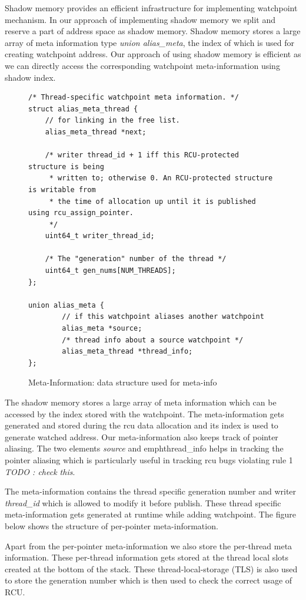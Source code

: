 Shadow memory provides an efficient infrastructure for implementing watchpoint mechanism. In our approach of implementing shadow memory we split and reserve a part of address space as shadow memory. Shadow memory stores a large array of meta information type \emph{union alias\_meta}, the index of which is used for creating watchpoint address. Our approach of using shadow memory is efficient as we can directly access the corresponding watchpoint meta-information using shadow index. 

\begin{figure}[h]
\begin{lstlisting}
/* Thread-specific watchpoint meta information. */
struct alias_meta_thread {
    // for linking in the free list.
    alias_meta_thread *next;

    /* writer thread_id + 1 iff this RCU-protected structure is being
     * written to; otherwise 0. An RCU-protected structure is writable from
     * the time of allocation up until it is published using rcu_assign_pointer.
     */
    uint64_t writer_thread_id;

    /* The "generation" number of the thread */
    uint64_t gen_nums[NUM_THREADS];
};

union alias_meta {
        // if this watchpoint aliases another watchpoint
        alias_meta *source;
        /* thread info about a source watchpoint */
        alias_meta_thread *thread_info;
}; 
\end{lstlisting}
\caption{Meta-Information: data structure used for meta-info}\label{fig:metainfo}
\end{figure}

The shadow memory stores a large array of meta information which can be accessed by the index stored with the watchpoint. The meta-information gets generated and stored during the rcu data allocation and its index is used to generate watched address. Our meta-information also keeps track of pointer aliasing. The two elements \emph{source} and emph{thread\_info} helps in tracking the pointer aliasing which is particularly useful in tracking rcu bugs violating rule 1 \emph{TODO : check this}. 

The meta-information contains the thread specific generation number and writer \emph{thread\_id} which is allowed to modify it before publish. These thread specific meta-information gets generated at runtime while adding watchpoint. The figure below shows the structure of per-pointer meta-information. 

Apart from the per-pointer meta-information we also store the per-thread meta information. These per-thread information gets stored at the thread local slots created at the bottom of the stack. These thread-local-storage (TLS) is also used to store the generation number which is then used to check the correct usage of RCU.


